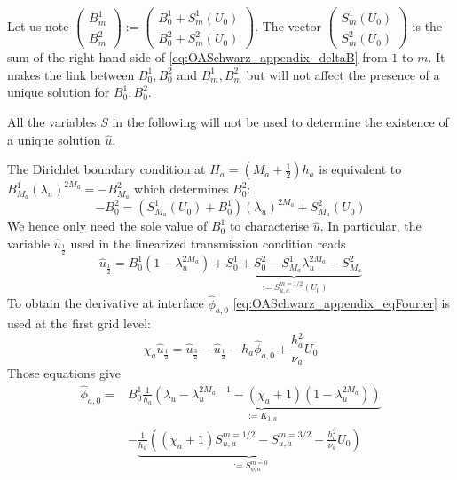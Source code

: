 Let us note 
$\begin{pmatrix}
B_m^1\\
B_m^2
\end{pmatrix}
:= \begin{pmatrix}
	 B^1_0 + S_m^1(U_0)\\
	 B^2_0 + S_m^2(U_0)
\end{pmatrix}$.
The vector $\begin{pmatrix} S_m^1(U_0)\\ S_m^2(U_0) \end{pmatrix}$
is the sum of the right hand side of
\eqref{eq:OASchwarz_appendix_deltaB} from $1$ to $m$. It makes
the link between $B^1_0, B^2_0$ and $B^1_m, B^2_m$ but will not
affect the presence of a unique solution for $B^1_0, B^2_0$.
\begin{remark}
	All the variables $S$ in the following will not be used
	to determine the existence of a unique solution
	$\widehat{u}$.
\end{remark}
The Dirichlet boundary condition at $H_a = (M_a + \frac{1}{2})h_a$
is equivalent to
$B_{M_a}^1 (\lambda_u)^{2M_a} = - B_{M_a}^2$ which determines
$B^2_0$:
\begin{equation}
- B^2_0 = \left(S_{M_a}^1(U_0) + B^1_0\right)
	(\lambda_u)^{2M_a} + S_{M_a}^2(U_0)
\end{equation}
We hence only need the sole value of $B^1_0$ to characterise
$\widehat{u}$. In particular, the variable $\widehat{u}_{\frac{1}{2}}$
used in the linearized transmission condition reads
\begin{equation}
	\widehat{u}_{\frac{1}{2}} = B^1_0 (1 - \lambda_u^{2M_a})
	+ \underbrace{S_0^1+S_0^2 - S_{M_a}^1 \lambda_u^{2M_a}
		-S_{M_a}^2}_{:=S_{u, a}^{m=1/2}(U_0)}
\end{equation}
To obtain the derivative at interface $\widehat{\phi}_{a,0}$
\eqref{eq:OASchwarz_appendix_eqFourier} is used
at the first grid level:
\begin{equation}
	\chi_a \widehat{u}_{\frac{1}{2}} =
	\widehat{u}_{\frac{3}{2}} - \widehat{u}_{\frac{1}{2}}
	- h_a \widehat{\phi}_{a,0} + \frac{h^2_a}{\nu_a} U_0
\end{equation}
Those equations give
\begin{equation}
	\begin{aligned}
		\widehat{\phi}_{a,0} =& B^1_0 \underbrace{\frac{1}{h_a}
		\left(
			\lambda_u-\lambda_u^{2M_a-1}
			- (\chi_a+1)(1-\lambda_u^{2M_a})
			\right)}_{:=K_{1,a}}\\
		&-\underbrace{\frac{1}{h_a}\left((\chi_a + 1) S_{u,a}^{m=1/2}
		- S_{u,a}^{m=3/2}
		- \frac{h_a^2}{\nu_a} U_0\right)}_{:=S_{\phi,a}^{m=0}}
	\end{aligned}
\end{equation}
